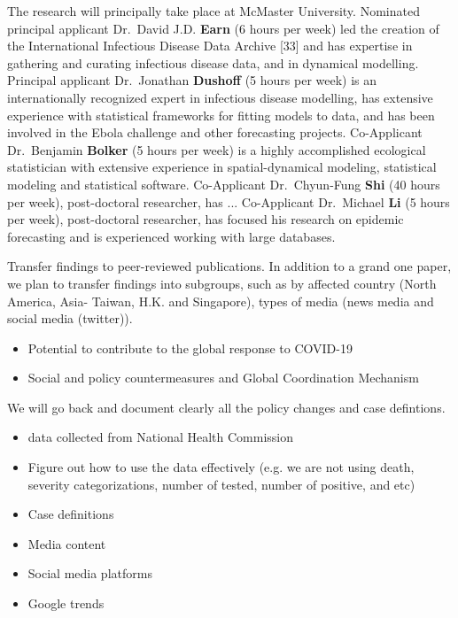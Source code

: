 The research will principally take place at McMaster University. 
Nominated principal applicant Dr.\ David J.D. \textbf{Earn} (6 hours per week) led the creation of the International Infectious Disease Data Archive [33] and has expertise in gathering and curating infectious disease data, and in dynamical modelling.
Principal applicant Dr.\ Jonathan \textbf{Dushoff} (5 hours per week) is an internationally recognized expert in infectious disease modelling, has extensive experience with statistical frameworks for fitting models to data, and has been involved in the Ebola challenge and other forecasting projects. 
Co-Applicant Dr.\ Benjamin \textbf{Bolker} (5 hours per week) is a highly accomplished ecological statistician with extensive experience in spatial-dynamical modeling, statistical modeling and statistical software.
Co-Applicant Dr.\ Chyun-Fung \textbf{Shi} (40 hours per week), post-doctoral researcher, has ...
Co-Applicant Dr.\ Michael \textbf{Li} (5 hours per week), post-doctoral researcher, has focused his research on epidemic forecasting and is experienced working with large databases. 







Transfer findings to peer-reviewed publications.  
In addition to a grand one paper, we plan to transfer findings into subgroups, such as by affected country (North America, Asia- Taiwan, H.K. and Singapore), types of media (news media and social media (twitter)).

\begin{itemize}
\item{Potential to contribute to the global response to COVID-19}
\item{Social and policy countermeasures and Global Coordination Mechanism}
\end{itemize}



We will go back and document clearly all the policy changes and case defintions. 

\begin{itemize}
\item{data collected from National Health Commission}
\item{Figure out how to use the data effectively (e.g. we are not using death, severity categorizations, number of tested, number of positive, and etc)}
\item{Case definitions}
\item{Media content}
\item{Social media platforms}
\item{Google trends}
\end{itemize}

